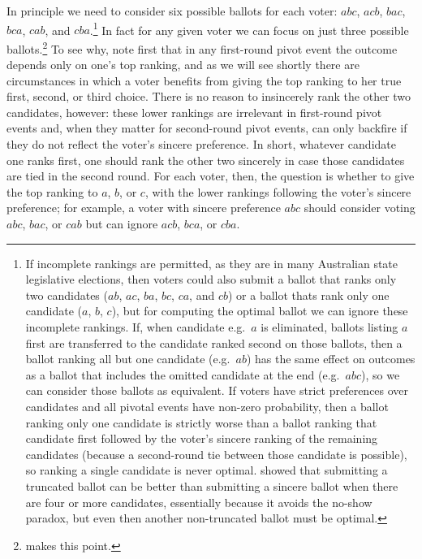 \documentclass[11pt,a4paper]{article}
\begin{document}
In principle we need to consider six possible ballots for each voter: $abc$, $acb$, $bac$, $bca$, $cab$, and $cba$.\footnote{If incomplete rankings are permitted, as they are in many Australian state legislative elections, then voters could also submit a ballot that ranks only two candidates ($ab$, $ac$, $ba$, $bc$, $ca$, and $cb$) or a ballot thats rank only one candidate ($a$, $b$, $c$), but for computing the optimal ballot we can ignore these incomplete rankings. If, when candidate e.g.\ $a$ is eliminated, ballots listing $a$ first are transferred to the candidate ranked second on those ballots, then a ballot ranking all but one candidate (e.g.\ $ab$) has the same effect on outcomes as a ballot that includes the omitted candidate at the end (e.g.\ $abc$), so we can consider those ballots as equivalent. If voters have strict preferences over candidates and all pivotal events have non-zero probability, then a ballot ranking only one candidate is strictly worse than a ballot ranking that candidate first followed by the voter's sincere ranking of the remaining candidates (because a second-round tie between those candidate is possible), so ranking a single candidate is never optimal. \citet{fishburn1984manipulability} showed that submitting a truncated ballot can be better than submitting a sincere ballot when there are four or more candidates, essentially because it avoids the no-show paradox, but even then another non-truncated ballot must be optimal.}  In fact for any given voter we can focus on just three possible ballots.\footnote{\citet[][p.~224]{dummett1984voting} makes this point.} To see why, note first that in any first-round pivot event the outcome depends only on one's top ranking, and as we will see shortly there are circumstances in which a voter benefits from giving the top ranking to her true first, second, or third choice. There is no reason to insincerely rank the other two candidates, however: these lower rankings are irrelevant in first-round pivot events and, when they matter for second-round pivot events, can only backfire if they do not reflect the voter's sincere preference. In short, whatever candidate one ranks first, one should rank the other two sincerely in case those candidates are tied in the second round. %
For each voter, then, the question is whether to give the top ranking to $a$, $b$, or $c$, with the lower rankings following the voter's sincere preference; for example, a voter with sincere preference $abc$ should consider voting $abc$, $bac$, or $cab$ but can ignore $acb$, $bca$, or $cba$. \\
\end{document}

